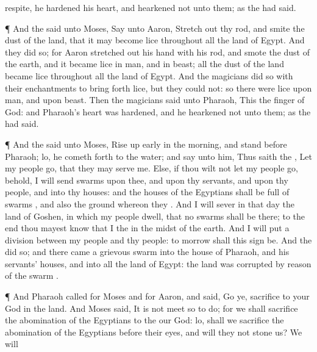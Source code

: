 {respite, he
hardened his
heart, and
hearkened not unto them; as the
{} had
said.
\par }{\PP {}¶ And the
{}
said unto
Moses,
Say unto
Aaron, Stretch
out thy
rod, and
smite the
dust of the
land, that it may become
lice throughout all the
land of
Egypt.
And they
did so; for
Aaron stretched
out his
hand with his
rod, and
smote the
dust of the
earth, and it became
lice in
man, and in
beast; all the
dust of the
land became
lice throughout all the
land of
Egypt.
And the
magicians
did so with their
enchantments to bring
forth
lice, but they
could not: so there were
lice upon
man, and upon
beast.
Then the
magicians
said unto
Pharaoh, This
{} the
finger of
God: and
Pharaoh’s
heart was
hardened, and he
hearkened not unto them; as the
{} had
said.
\par }{\PP {}¶ And the
{}
said unto
Moses, Rise up
early in the
morning, and
stand
before
Pharaoh; lo, he cometh
forth to the
water; and
say unto him, Thus
saith the
{}, Let my
people
go, that they may
serve me.
Else, if thou wilt not let my
people
go, behold, I will
send
swarms
{} upon thee, and upon thy
servants, and upon thy
people, and into thy
houses: and the
houses of the
Egyptians shall be
full of
swarms
{}, and also the
ground whereon they
{}.
And I will
sever in that
day the
land of
Goshen, in which my
people
dwell, that
no
swarms
{} shall
be there; to the
end thou mayest
know that I
{} the
{} in the
midst of the
earth.
And I will
put a
division between my
people and thy
people: to
morrow shall this
sign be.
And the
{}
did so; and there
came a
grievous
swarm
{} into the
house of
Pharaoh, and
{} his
servants’
houses, and into all the
land of
Egypt: the
land was
corrupted by
reason of the
swarm
{}.
\par }{\PP {}¶ And
Pharaoh
called
for
Moses and for
Aaron, and
said,
Go ye,
sacrifice to your
God in the
land.
And
Moses
said, It is not
meet so to
do;
for we shall
sacrifice the
abomination of the
Egyptians to the
{} our
God: lo, shall we
sacrifice the
abomination of the
Egyptians before their
eyes, and will they not
stone us?
We will
}
